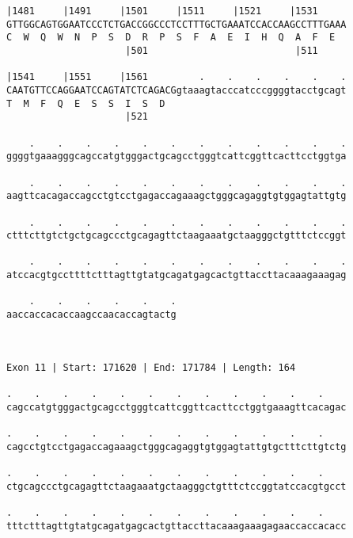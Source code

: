 \documentclass{article}
\begin{document}
\begin{Verbatim}
|1481     |1491     |1501     |1511     |1521     |1531     
GTTGGCAGTGGAATCCCTCTGACCGGCCCTCCTTTGCTGAAATCCACCAAGCCTTTGAAA
C  W  Q  W  N  P  S  D  R  P  S  F  A  E  I  H  Q  A  F  E  
                     |501                          |511     
  
|1541     |1551     |1561         .    .    .    .    .    .
CAATGTTCCAGGAATCCAGTATCTCAGACGgtaaagtacccatcccggggtacctgcagt
T  M  F  Q  E  S  S  I  S  D                                
                     |521                                   
  
    .    .    .    .    .    .    .    .    .    .    .    .
ggggtgaaagggcagccatgtgggactgcagcctgggtcattcggttcacttcctggtga
                                                            
    .    .    .    .    .    .    .    .    .    .    .    .
aagttcacagaccagcctgtcctgagaccagaaagctgggcagaggtgtggagtattgtg
                                                            
    .    .    .    .    .    .    .    .    .    .    .    .
ctttcttgtctgctgcagccctgcagagttctaagaaatgctaagggctgtttctccggt
                                                            
    .    .    .    .    .    .    .    .    .    .    .    .
atccacgtgccttttctttagttgtatgcagatgagcactgttaccttacaaagaaagag
                                                            
    .    .    .    .    .    .
aaccaccacaccaagccaacaccagtactg
                              
                              
 
Exon 11 | Start: 171620 | End: 171784 | Length: 164
 
.    .    .    .    .    .    .    .    .    .    .    .    
cagccatgtgggactgcagcctgggtcattcggttcacttcctggtgaaagttcacagac
                                                            
.    .    .    .    .    .    .    .    .    .    .    .    
cagcctgtcctgagaccagaaagctgggcagaggtgtggagtattgtgctttcttgtctg
                                                            
.    .    .    .    .    .    .    .    .    .    .    .    
ctgcagccctgcagagttctaagaaatgctaagggctgtttctccggtatccacgtgcct
                                                            
.    .    .    .    .    .    .    .    .    .    .    .    
tttctttagttgtatgcagatgagcactgttaccttacaaagaaagagaaccaccacacc
                                                            

\end{Verbatim}
\end{document}

